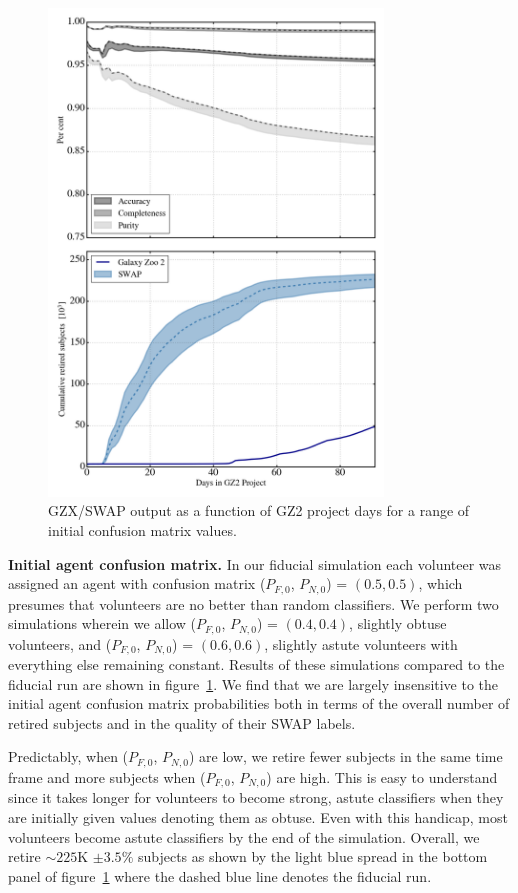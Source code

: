 \documentclass[twocolumn]{aastex6}
\newcommand{\Pf}{$P_{F,0}$}
\newcommand{\Pn}{$P_{N,0}$}
\begin{document}
\begin{figure}[t!]
\includegraphics[width=3.5in]{figures/GZX_eval_and_retirement_PLPD_spread_4paper_v2.png}
\caption{GZX/SWAP output as a function of GZ2 project days for a range of initial
confusion matrix values.  \label{fig: confusionMatrixAnalysis}}
\end{figure}

\textbf{Initial agent confusion matrix.} 
In our fiducial simulation each volunteer was assigned an agent with confusion matrix
 (\Pf, \Pn) = $(0.5, 0.5)$, which presumes that volunteers are no better than 
random classifiers.  We perform two simulations wherein we allow (\Pf, \Pn) = $(0.4, 0.4)$, 
slightly obtuse volunteers, and (\Pf, \Pn) = $(0.6, 0.6)$, slightly astute volunteers 
with everything else remaining constant.  
Results of these simulations compared to the fiducial run are shown in 
figure~\ref{fig: confusionMatrixAnalysis}. We find that we are largely insensitive to the 
initial agent confusion matrix probabilities both in terms of the overall number of retired subjects
and in the quality of their SWAP labels. 

Predictably, when (\Pf, \Pn) are low, we retire fewer subjects in the same time frame and 
more subjects when (\Pf, \Pn) are high. This is easy to understand since it takes 
longer for volunteers to become strong, astute classifiers when they are initially 
given values denoting them as obtuse. Even with this handicap, most volunteers 
become astute classifiers by the end of the simulation. Overall,  we retire 
$\sim225$K  $\pm 3.5\%$ subjects as shown by the light blue spread in the bottom
panel of figure~\ref{fig: confusionMatrixAnalysis} where the dashed blue line
denotes the fiducial run. 
\end{document}

